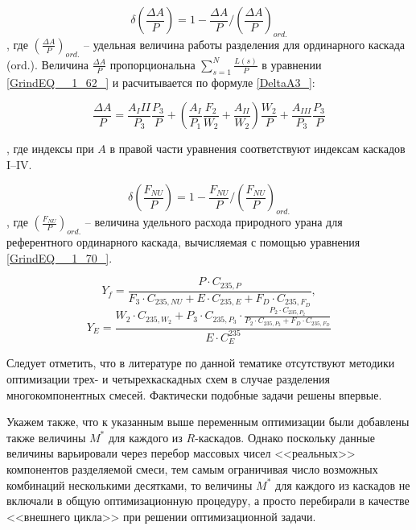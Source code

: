 \begin{equation} \label{DeltaA3} 
    \delta(\frac{\Delta A}{P})=1-\frac{\Delta A}{P}/(\frac{\Delta A}{P})_{ord.}
\end{equation}
, где $(\frac{\Delta A}{P})_{ord.}$ -- удельная величина работы разделения для ординарного каскада (ord.). Величина $\frac{\Delta A}{P}$ пропорциональна $\sum _{s=1}^{N}\frac{L(s)}{P}$ в уравнении \ref{GrindEQ__1_62_} и расчитывается по формуле \ref{DeltaA3_}:

\begin{equation} \label{DeltaA3_} 
\frac{\Delta A}{P} = \frac{A_III}{P_3} \frac{P_3}{P}+(\frac{A_I}{P_1} \frac{F_2}{W_2}+\frac{A_{II}}{W_2}) \frac{W_2}{P} + \frac{A_{III}}{P_3} \frac{P_3}{P}
\end{equation}

, где индексы при $A$ в правой части уравнения соответствуют индексам каскадов I--IV.

\begin{equation} \label{DeltaFnu3} 
\delta(\frac{F_{NU}}{P})=1-\frac{F_{NU}}{P}/(\frac{F_{NU}}{P})_{ord.}
\end{equation} 
, где $(\frac{F_{NU}}{P})_{ord.}$ -- величина удельного расхода природного урана для референтного ординарного каскада, вычисляемая с помощью уравнения \ref{GrindEQ__1_70_}.

\begin{equation} \label{Rec3} 
    Y_{f} = \frac{P \cdot C_{235,P}}{F_3 \cdot C_{235,NU} + E \cdot C_{235,E} + F_D \cdot C_{235,F_D}},
\end{equation} 
\begin{equation} \label{RecR3} 
    Y_{E} = \frac{W_2\cdot C_{235,W_2} + P_3\cdot C_{235,P_3}\cdot \frac{P_2\cdot C_{235,P_2}}{P_2\cdot C_{235,P_2}+ F_D \cdot C_{235,F_D}}}{E \cdot C_{E}^{235}}        
\end{equation} 

Следует отметить, что в литературе по данной тематике отсутствуют методики оптимизации трех- и четырехкаскадных схем в случае разделения многокомпонентных смесей. Фактически подобные задачи решены впервые.

Укажем также, что к указанным выше переменным оптимизации были добавлены также величины $M^{*}$ для каждого из $R$-каскадов. Однако поскольку данные величины варьировали через перебор массовых чисел <<реальных>> компонентов разделяемой смеси, тем самым ограничивая число возможных комбинаций несколькими десятками, то величины  $M^{*}$ для каждого из каскадов не включали в общую оптимизационную процедуру, а просто перебирали в качестве <<внешнего цикла>> при решении оптимизационной задачи.

